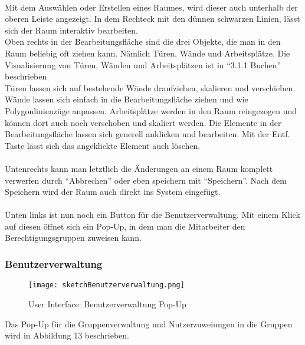 \paragraph{}Mit dem Auswählen oder Erstellen eines Raumes, wird dieser auch unterhalb der oberen Leiste angezeigt. 
In dem Rechteck mit den dünnen schwarzen Linien, lässt sich der Raum interaktiv bearbeiten.
\\
Oben rechts in der Bearbeitungsfläche sind die drei Objekte, die man in den Raum beliebig oft ziehen kann.
Nämlich Türen, Wände und Arbeitsplätze.
Die Visualisierung von Türen, Wänden und Arbeitsplätzen ist in "`3.1.1 Buchen"' beschrieben
\\
Türen lassen sich auf bestehende Wände draufziehen, skalieren und verschieben.
Wände lassen sich einfach in die Bearbeitungsfläche ziehen und wie Polygonlinienzüge anpassen.
Arbeitsplätze werden in den Raum reingezogen und können dort auch noch verschoben und skaliert werden.
Die Elemente in der Bearbeitungsfläche lassen sich generell anklicken und bearbeiten.
Mit der Entf. Taste lässt sich das angeklickte Element auch löschen.

\paragraph{} Untenrechts kann man letztlich die Änderungen an einem Raum komplett verwerfen durch "`Abbrechen"'
oder eben speichern mit "`Speichern"'.
Nach dem Speichern wird der Raum auch direkt ins System eingefügt.

\paragraph{} Unten links ist nun noch ein Button für die Benutzerverwaltung.
Mit einem Klick auf diesen öffnet sich ein Pop-Up, in dem man die Mitarbeiter den Berechtigungsgruppen zuweisen kann.

\newpage
\subsubsection{Benutzerverwaltung}

\begin{wrapfigure}{r}{5.5cm}
  \texttt{[image: sketchBenutzerverwaltung.png]}
  \caption{User Interface: Benutzerverwaltung Pop-Up}
\end{wrapfigure}

Das Pop-Up für die Gruppenverwaltung und Nutzerzuweiungen in die Gruppen wird in Abbildung 13 beschrieben.
\\
